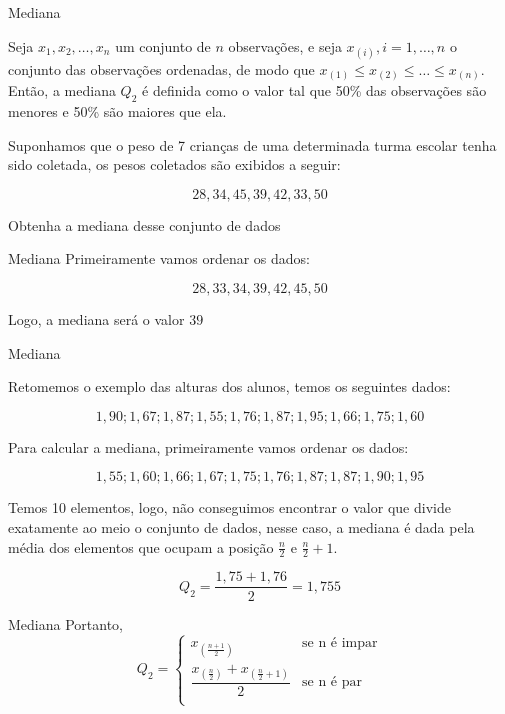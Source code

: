 \begin{frame}{Mediana}

Seja $x_1, x_2, \dots, x_n$ um conjunto de $n$ observações, e seja $x_{(i)}, i=1, \dots, n$
o conjunto das observações ordenadas, de modo que $x_{(1)} \leq x_{(2)} \leq \dots \leq x_{(n)}$.
Então, a mediana $Q_2$ é definida como o valor tal que 50\% das observações são menores
e 50\% são maiores que ela. 
\pause
\begin{exemplo}   

Suponhamos que o peso de 7 crianças de uma determinada turma escolar tenha sido coletada, os pesos coletados são exibidos a seguir:

$$28, 34, 45, 39, 42, 33, 50$$

Obtenha a mediana desse conjunto de dados
\end{exemplo}
\end{frame}

\begin{frame}{Mediana}
Primeiramente vamos ordenar os dados:

$$28, 33, 34, 39, 42, 45,  50$$

\pause 
Logo, a mediana será o valor $39$

\end{frame}

\begin{frame}{Mediana}
\begin{exemplo}
Retomemos o exemplo das alturas dos alunos, temos os seguintes dados:

$$1,90; 1,67; 1,87; 1,55; 1,76; 1,87; 1,95; 1,66; 1,75; 1,60$$

\end{exemplo}

Para calcular a mediana, primeiramente vamos ordenar os dados:

$$ 1,55; 1,60; 1,66; 1,67; 1,75; 1,76;  1,87;  1,87; 1,90; 1,95$$

\pause

Temos 10 elementos, logo, não conseguimos encontrar o valor que divide exatamente ao meio o conjunto de dados, nesse caso, a mediana é dada pela média dos elementos que ocupam a posição $\frac{n}{2}$ e $\frac{n}{2} +1 $.

$$Q_2 = \dfrac{1,75 + 1,76}{2} = 1,755$$
\end{frame}

\begin{frame}{Mediana}
Portanto, 
$$Q_2 = \begin{cases}
    x_{\left(\frac{n+1}{2} \right)} & \text{se n é impar}\\
    \dfrac{x_{\left(\frac{n}{2}\right)} + x_{\left(\frac{n}{2} + 1 \right)} }{2} & \text{se n é par}\\
\end{cases}$$
\end{frame}

